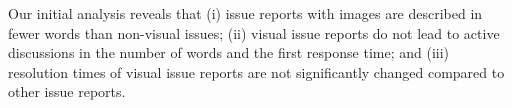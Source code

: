 Our initial analysis reveals that 
(i) issue reports with images are described in fewer words than non-visual issues; 
(ii) visual issue reports do not lead to active discussions in the number of words and the first response time; and 
(iii) resolution times of visual issue reports are not significantly changed compared to other issue reports. 
